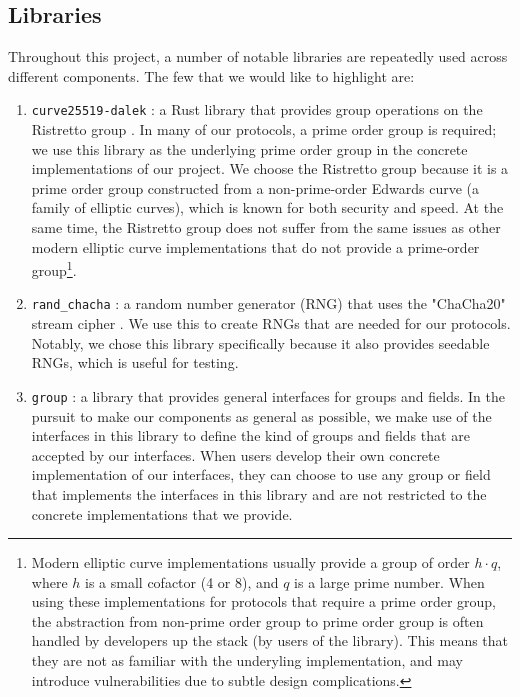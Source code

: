 \subsection{Libraries}\label{sec:libraries}
Throughout this project, a number of notable libraries are repeatedly 
used across different components. The few that we would like to highlight 
are:
\begin{enumerate}
  \item \texttt{curve25519-dalek} \cite{curve25519-dalek}: a Rust library that 
  provides group operations on the Ristretto group \cite{ristretto_web}. In many 
  of our protocols, a prime order group is required; we use this library as 
  the underlying prime order group in the concrete implementations of 
  our project. We choose the Ristretto group because it is a prime order 
  group constructed from a non-prime-order Edwards curve \cite{Edwards2007}
  (a family of elliptic curves), which is known for both security and speed. 
  At the same time, the Ristretto group does not suffer from the same issues as 
  other modern elliptic curve implementations that do not provide a prime-order group\footnote{
    Modern elliptic curve implementations usually provide a group of order $h \cdot q$, where 
    $h$ is a small cofactor (4 or 8), and $q$ is a large prime number. When using these 
    implementations for protocols that require a prime order group, the abstraction from 
    non-prime order group to prime order group is often handled by developers up the stack 
    (by users of the library). This means that they are not as familiar with the underyling 
      implementation, and may introduce vulnerabilities due to subtle design complications.
  }. 
  
  \item \texttt{rand\_chacha} \cite{rand-chacha}: a random number generator (RNG) that uses the 
  "ChaCha20" stream cipher \cite{bernstein2008chacha}. We use this to create RNGs 
  that are needed for our protocols. Notably, we chose this library 
  specifically because it also provides seedable RNGs, 
  which is useful for testing. 
  \item \texttt{group} \cite{group}: a library that provides general interfaces for 
  groups and fields. In the pursuit to make our components as general as 
  possible, we make use of the interfaces in this library to define the 
  kind of groups and fields that are accepted by our interfaces. When users 
  develop their own concrete implementation of our interfaces, they can 
  choose to use any group or field that implements the interfaces in this 
  library and are not restricted to the concrete implementations that we 
  provide. 
\end{enumerate} 


